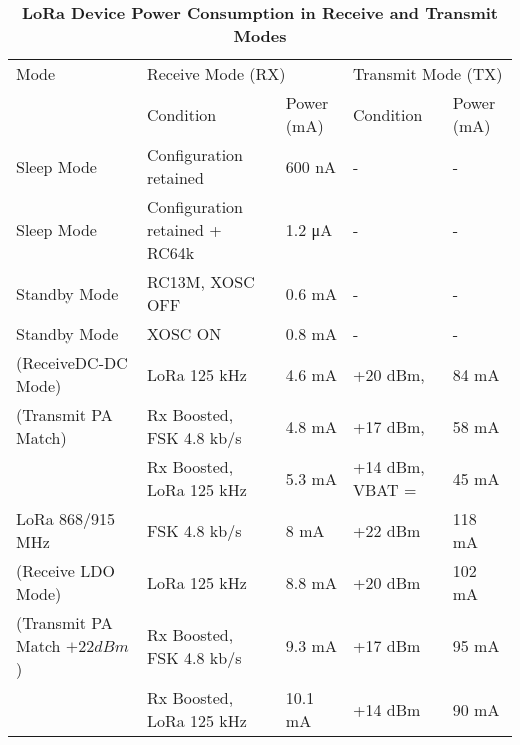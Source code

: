 \begin{table}[ht]
    \centering
    \small
    \begin{tabularx}{\textwidth}{l|X|X|X|X}
    \toprule
    Mode & \multicolumn{2}{X|}{Receive Mode (RX)} & \multicolumn{2}{X}{Transmit Mode (TX)} \\
    \cmidrule(lr){2-3} \cmidrule(lr){4-5}
     & Condition & Power (mA) & Condition & Power (mA) \\
    \midrule
    Sleep Mode & Configuration retained & 600 nA & - & - \\
    Sleep Mode & Configuration retained + RC64k & 1.2 μA & - & - \\
    Standby Mode & RC13M, XOSC OFF & 0.6 mA & - & - \\
    Standby Mode & XOSC ON & 0.8 mA & - & - \\
    \midrule
    (ReceiveDC-DC Mode) & LoRa 125 kHz & 4.6 mA & +20 dBm,  & 84 mA \\
    (Transmit PA Match)& Rx Boosted, FSK 4.8 kb/s & 4.8 mA & +17 dBm,  & 58 mA \\
    & Rx Boosted, LoRa 125 kHz & 5.3 mA & +14 dBm, VBAT =  & 45 mA \\
    \midrule
    LoRa 868/915 MHz & FSK 4.8 kb/s & 8 mA & +22 dBm & 118 mA \\
    (Receive LDO Mode) & LoRa 125 kHz & 8.8 mA & +20 dBm & 102 mA \\
    (Transmit PA Match $+22 dBm$) & Rx Boosted, FSK 4.8 kb/s & 9.3 mA & +17 dBm & 95 mA \\
    & Rx Boosted, LoRa 125 kHz & 10.1 mA & +14 dBm & 90 mA \\
    \midrule
    \bottomrule
    \end{tabularx}
    \caption{\textbf{LoRa Device Power Consumption in Receive and Transmit Modes}}
    \label{tab:lora_power}
\end{table}